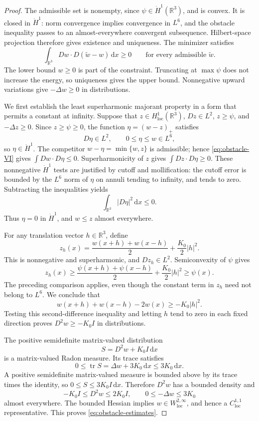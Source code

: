 \documentclass[11pt,a4paper,reqno]{amsart}
\theoremstyle{plain}
\theoremstyle{remark}
\numberwithin{equation}{section}
\newcommand{\R}{\mathbb R}
\newcommand{\dd}{\,\mathrm d}
\DeclareMathOperator{\tr}{tr}
\begin{document}
\begin{proof}
The admissible set is nonempty, since $\psi\in\dot H^1(\R^3)$, and is convex. It is closed in $\dot H^1$: norm convergence implies convergence in $L^6$, and the obstacle inequality passes to an almost-everywhere convergent subsequence. Hilbert-space projection therefore gives existence and uniqueness. The minimizer satisfies
\begin{equation}\label{eq:obstacle-VI}
 \int_{\R^3}Dw\cdot D(\widetilde w-w)\dd x\ge0
 \qquad\text{for every admissible }\widetilde w.
\end{equation}
The lower bound $w\ge0$ is part of the constraint. Truncating at $\max\psi$ does not increase the energy, so uniqueness gives the upper bound. Nonnegative upward variations give $-\Delta w\ge0$ in distributions.

We first establish the least superharmonic majorant property in a form that permits a constant at infinity. Suppose that $z\in H^1_{\mathrm{loc}}(\R^3)$, $Dz\in L^2$, $z\ge\psi$, and $-\Delta z\ge0$. Since $z\ge\psi\ge0$, the function $\eta=(w-z)_+$ satisfies
\[
 D\eta\in L^2,\qquad 0\le\eta\le w\in L^6,
\]
so $\eta\in\dot H^1$. The competitor $w-\eta=\min\{w,z\}$ is admissible; hence \eqref{eq:obstacle-VI} gives $\int Dw\cdot D\eta\le0$. Superharmonicity of $z$ gives $\int Dz\cdot D\eta\ge0$. These nonnegative $\dot H^1$ tests are justified by cutoff and mollification: the cutoff error is bounded by the $L^6$ norm of $\eta$ on annuli tending to infinity, and tends to zero. Subtracting the inequalities yields
\[
 \int_{\R^3}|D\eta|^2\dd x\le0.
\]
Thus $\eta=0$ in $\dot H^1$, and $w\le z$ almost everywhere.

For any translation vector $h\in\R^3$, define
\[
 z_h(x)=\frac{w(x+h)+w(x-h)}2+\frac{K_0}2|h|^2.
\]
This is nonnegative and superharmonic, and $Dz_h\in L^2$. Semiconvexity of $\psi$ gives
\[
 z_h(x)\ge\frac{\psi(x+h)+\psi(x-h)}2+\frac{K_0}2|h|^2
          \ge\psi(x).
\]
The preceding comparison applies, even though the constant term in $z_h$ need not belong to $L^6$. We conclude that
\[
 w(x+h)+w(x-h)-2w(x)\ge-K_0|h|^2.
\]
Testing this second-difference inequality and letting $h$ tend to zero in each fixed direction proves $D^2w\ge-K_0I$ in distributions.

The positive semidefinite matrix-valued distribution
\[
 S=D^2w+K_0I\dd x
\]
is a matrix-valued Radon measure. Its trace satisfies
\[
 0\le\tr S=\Delta w+3K_0\dd x\le3K_0\dd x.
\]
A positive semidefinite matrix-valued measure is bounded above by its trace times the identity, so $0\le S\le3K_0I\dd x$. Therefore $D^2w$ has a bounded density and
\[
 -K_0I\le D^2w\le2K_0I,
 \qquad 0\le-\Delta w\le3K_0
\]
almost everywhere. The bounded Hessian implies $w\in W^{2,\infty}_{\mathrm{loc}}$, and hence a $C^{1,1}_{\mathrm{loc}}$ representative. This proves \eqref{eq:obstacle-estimates}.
\end{proof}
\end{document}
